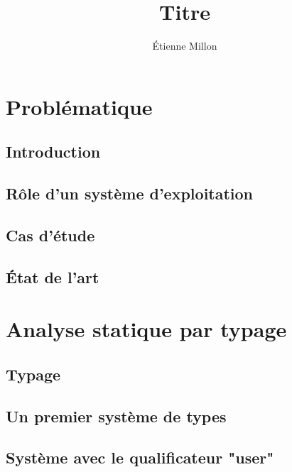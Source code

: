 \documentclass[12pt]{phdthesis}
\title{Titre}
\author{Étienne Millon}
\begin{document}

\tableofcontents


\part{Problématique}

\chapter{Introduction}

\chapter{Rôle d'un système d'exploitation}



\chapter{Cas d'étude}



\chapter{État de l'art}



\part{Analyse statique par typage}

\chapter{Typage}



\chapter{Un premier système de types}



\chapter{Système avec le qualificateur "user"}
\end{document}
